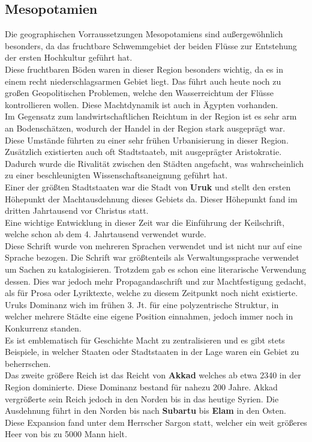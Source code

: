 \documentclass{article}
\begin{document}
	\subsection{Mesopotamien}
	Die geographischen Vorraussetzungen Mesopotamiens sind außergewöhnlich besonders, da das fruchtbare Schwemmgebiet der beiden Flüsse zur Entstehung der ersten Hochkultur geführt hat. \\
	Diese fruchtbaren Böden waren in dieser Region besonders wichtig, da es in einem recht niederschlagsarmen Gebiet liegt. Das führt auch heute noch zu großen Geopolitischen Problemen, welche den Wasserreichtum der Flüsse kontrollieren wollen. Diese Machtdynamik ist auch in Ägypten vorhanden. \\
	Im Gegensatz zum landwirtschaftlichen Reichtum in der Region ist es sehr arm an Bodenschätzen, wodurch der Handel in der Region stark ausgeprägt war. \\
	Diese Umstände führten zu einer sehr frühen Urbanisierung in dieser Region. Zusätzlich existierten auch oft Stadtstaateb, mit ausgeprägter Aristokratie. Dadurch wurde die Rivalität zwischen den Städten angefacht, was wahrscheinlich zu einer beschleunigten Wissenschaftsaneignung geführt hat. \\
	Einer der größten Stadtstaaten war die Stadt von \textbf{Uruk} und stellt den ersten Höhepunkt der Machtausdehnung dieses Gebiets da. Dieser Höhepunkt fand im dritten Jahrtausend vor Christus statt. \\
	Eine wichtige Entwicklung in dieser Zeit war die Einführung der Keilschrift, welche schon ab dem 4. Jahrtausend verwendet wurde. \\
	Diese Schrift wurde von mehreren Sprachen verwendet und ist nicht nur auf eine Sprache bezogen. Die Schrift war größtenteils als Verwaltungssprache verwendet um Sachen zu katalogisieren. Trotzdem gab es schon eine literarische Verwendung dessen. Dies war jedoch mehr Propagandaschrift und zur Machtfestigung gedacht, als für Prosa oder Lyriktexte, welche zu diesem Zeitpunkt noch nicht existierte. \\
	Uruks Dominanz wich im frühen 3. Jt. für eine polyzentrische Struktur, in welcher mehrere Städte eine eigene Position einnahmen, jedoch immer noch in Konkurrenz standen. \\
	Es ist emblematisch für Geschichte Macht zu zentralisieren und es gibt stets Beispiele, in welcher Staaten oder Stadtstaaten in der Lage waren ein Gebiet zu beherrschen. \\
	Das zweite größere Reich ist das Reicht von \textbf{Akkad} welches ab etwa 2340 in der Region dominierte. Diese Dominanz bestand für nahezu 200 Jahre. Akkad vergrößerte sein Reich jedoch in den Norden bis in das heutige Syrien. Die Ausdehnung führt in den Norden bis nach \textbf{Subartu} bis \textbf{Elam} in den Osten. Diese Expansion fand unter dem Herrscher Sargon statt, welcher ein weit größeres Heer von bis zu 5000 Mann hielt. \\
\end{document}
